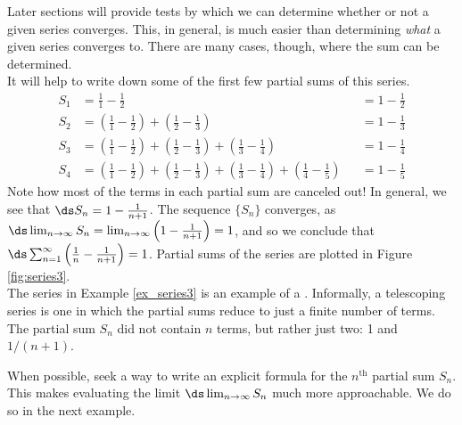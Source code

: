 Later sections will provide tests by which we can determine whether or not a given series converges. This, in general, is much easier than determining \emph{what} a given series converges to. There are many cases, though, where the sum can be determined. \\


{It will help to write down some of the first few partial sums of this series.
\begin{align*}
S_1 &=	\frac11-\frac12 & & = 1-\frac12\\
S_2 &=	\left(\frac11-\frac12\right) + \left(\frac12-\frac13\right) & & = 1-\frac13\\
S_3 &=	\left(\frac11-\frac12\right) + \left(\frac12-\frac13\right)+\left(\frac13-\frac14\right) & &= 1-\frac14\\
S_4 &=	\left(\frac11-\frac12\right) + \left(\frac12-\frac13\right)+\left(\frac13-\frac14\right) +\left(\frac14-\frac15\right)& &= 1-\frac15
\end{align*}
Note how most of the terms in each partial sum are canceled out! In general, we see that $\ds S_n = 1-\frac{1}{n+1}$. The sequence $\{S_n\}$ converges,  as $\ds \lim_{n\to\infty}S_n = \lim_{n\to\infty}\left(1-\frac1{n+1}\right) = 1$, and so we conclude that $\ds \sum_{n=1}^\infty \left(\frac1n-\frac1{n+1}\right) = 1$. Partial sums of the series are plotted in Figure \ref{fig:series3}.
}\\

The series in Example \ref{ex_series3} is an example of a . Informally, a telescoping series is one in which the partial sums reduce to just a finite number of terms. The partial sum $S_n$ did not contain $n$ terms, but rather just two: 1 and $1/(n+1)$.

When possible, seek a way to write an explicit formula for the $n^\text{th}$ partial sum $S_n$. This makes evaluating the limit $\ds\lim_{n\to\infty} S_n$ much more approachable. We do so in the next example.\\




